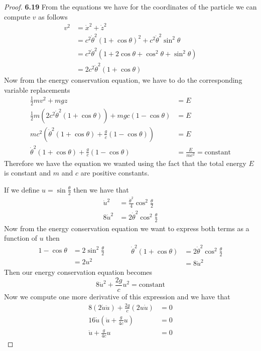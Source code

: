 \documentclass[11pt]{article}
\theoremstyle{definition}
\begin{document}
    \begin{proof}{\textbf{6.19}}
        From the equations we have for the coordinates of the particle we can compute $v$
        as follows
        \begin{align*}
            v^2 &= \dot{x}^2 + \dot{z}^2\\
                &= c^2\dot{\theta}^2(1 + \cos\theta)^2 + c^2\dot{\theta}^2\sin^2\theta\\
                &= c^2\dot{\theta}^2(1 + 2\cos\theta + \cos^2\theta + \sin^2\theta)\\
                &= 2c^2\dot{\theta}^2(1 + \cos\theta)
        \end{align*}
        Now from the energy conservation equation, we have to do the corresponding
        variable replacements
        \begin{align*}
            \frac{1}{2}mv^2 + mgz &= E\\
            \frac{1}{2}m(2c^2\dot{\theta}^2(1 + \cos\theta)) + mgc(1-\cos\theta) &= E\\
            mc^2(\dot{\theta}^2(1 + \cos\theta) + \frac{g}{c}(1-\cos\theta)) &= E\\
            \dot{\theta}^2(1 + \cos\theta) + \frac{g}{c}(1-\cos\theta) &= \frac{E}{mc^2} = \text{constant}
        \end{align*}
        Therefore we have the equation we wanted using the fact that the total energy
        $E$ is constant and $m$ and $c$ are positive constants.

        If we define $u = \sin{\frac{\theta}{2}}$ then we have that
        \begin{align*}
            \dot{u}^2 &= \frac{\dot{\theta}^2}{4}\cos^2{\frac{\theta}{2}}\\
            8\dot{u}^2 &= 2\dot{\theta}^2\cos^2{\frac{\theta}{2}}
        \end{align*}
        Now from the energy conservation equation we want to express both terms as a
        function of $u$ then
        \begin{equation*}
            \begin{split}
                1- \cos\theta &= 2\sin^2\frac{\theta}{2}\\
                              &= 2u^2
            \end{split}
            \quad\quad\quad
            \begin{split}
                \dot{\theta}^2(1 + \cos\theta) &= 2\dot{\theta}^2\cos^2\frac{\theta}{2}\\
                    &= 8\dot{u}^2 
            \end{split}
        \end{equation*}
        Then our energy conservation equation becomes
        $$8\dot{u}^2 + \frac{2g}{c}u^2 = \text{constant}$$
        Now we compute one more derivative of this expression and we have that
        \begin{align*}
            8(2\dot{u}\ddot{u}) + \frac{2g}{c}(2u\dot{u}) &= 0\\
            16\dot{u}(\ddot{u} + \frac{g}{4c}u) &= 0\\
            \ddot{u} + \frac{g}{4c}u &= 0
        \end{align*}
        

\end{proof}
\end{document}
